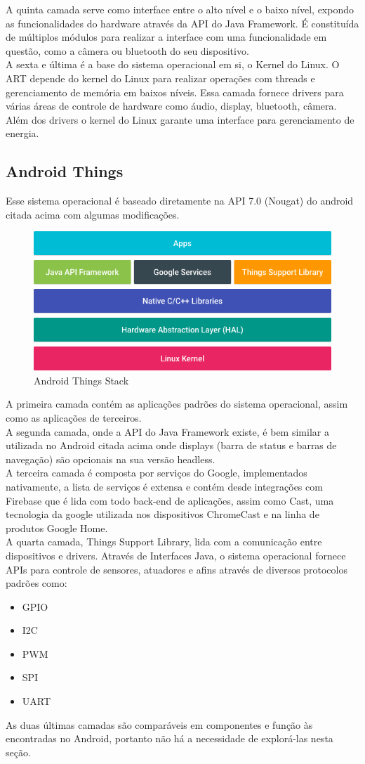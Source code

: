 \documentclass[12pt]{article}
\begin{document}
A quinta camada serve como interface entre o alto nível e o baixo nível, expondo as funcionalidades do hardware através da API do Java Framework. É constituída de múltiplos módulos para realizar a interface com uma funcionalidade em questão, como a câmera ou bluetooth do seu dispositivo.
\\A sexta e última é a base do sistema operacional em si, o Kernel do Linux. O ART depende do kernel do Linux para realizar operações com threads e gerenciamento de memória em baixos níveis. Essa camada fornece drivers para várias áreas de controle de hardware como áudio, display, bluetooth, câmera. Além dos drivers o kernel do Linux garante uma interface para gerenciamento de energia.

\subsection{Android Things}
Esse sistema operacional é baseado diretamente na API 7.0 (Nougat) do android citada acima com algumas modificações.
\begin{figure}[ht]
\centering
\includegraphics[width=.6\textwidth]{images/platform-architecture.png}
\caption{Android Things Stack}
\label{fig:androidstack}
\end{figure}

A primeira camada contém as aplicações padrões do sistema operacional, assim como as aplicações de terceiros.
\\A segunda camada, onde a API do Java Framework existe, é bem similar a utilizada no Android citada acima onde displays (barra de status e barras de navegação) são opcionais na sua versão headless.
\\A terceira camada é composta por serviços do Google, implementados nativamente, a lista de serviços é extensa e contém desde integrações com Firebase que é lida com todo back-end de aplicações, assim como Cast, uma tecnologia da google utilizada nos dispositivos ChromeCast e na linha de produtos Google Home.
\\A quarta camada, Things Support Library, lida com a comunicação entre dispositivos e drivers. Através de Interfaces Java, o sistema operacional fornece APIs para controle de sensores, atuadores e afins através de diversos protocolos padrões como:
\begin{itemize}
	\item GPIO
	\item I2C
	\item PWM
	\item SPI
	\item UART
\end{itemize}
As duas últimas camadas são comparáveis em componentes e função às encontradas no Android, portanto não há a necessidade de explorá-las nesta seção.
\end{document}
